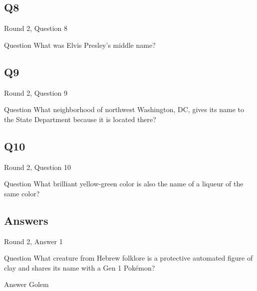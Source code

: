 \documentclass[11pt]{beamer}
\begin{document}
\subsection*{Q8}
\begin{frame}[t]{Round 2, Question 8}
\vspace{2em}
\begin{block}{Question}
What was Elvis Presley's middle name\@?
\end{block}
\end{frame}
    

\subsection*{Q9}
\begin{frame}[t]{Round 2, Question 9}
\vspace{2em}
\begin{block}{Question}
What neighborhood of northwest Washington, DC, gives its name to the State Department because it is located there\@?
\end{block}
\end{frame}
    

\subsection*{Q10}
\begin{frame}[t]{Round 2, Question 10}
\vspace{2em}
\begin{block}{Question}
What brilliant yellow-green color is also the name of a liqueur of the same color\@?
\end{block}
\end{frame}
    
\subsection{Answers}

\begin{frame}[t]{Round 2, Answer 1}
\vspace{2em}
\begin{block}{Question}
What creature from Hebrew folklore is a protective automated figure of clay and shares its name with a Gen 1 Pokémon\@?
\end{block}
\pause{}
\begin{block}{Answer}
Golem
\end{block}
\end{frame}
    
\end{document}
